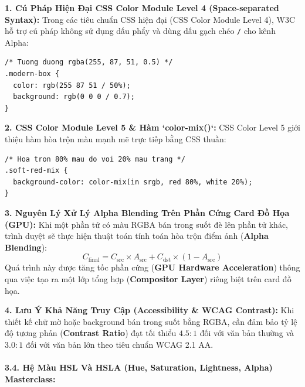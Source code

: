 \documentclass[11pt,oneside]{book}
\newcommand{\codeinline}[1]{\textcolor{accentOrange}{\texttt{#1}}}
\newcommand{\term}[1]{\textbf{\textcolor{primaryBlue}{#1}}}
\begin{document}
\begin{prettyTableBox}
\textbf{1. Cú Pháp Hiện Đại CSS Color Module Level 4 (Space-separated Syntax):}
Trong các tiêu chuẩn CSS hiện đại (CSS Color Module Level 4), W3C hỗ trợ cú pháp không sử dụng dấu phẩy và dùng dấu gạch chéo \codeinline{/} cho kênh Alpha:
\begin{codeWindow}
\begin{lstlisting}[language=CSS3]
/* Tuong duong rgba(255, 87, 51, 0.5) */
.modern-box {
  color: rgb(255 87 51 / 50%);
  background: rgb(0 0 0 / 0.7);
}
\end{lstlisting}
\end{codeWindow}

\textbf{2. CSS Color Module Level 5 \& Hàm `color-mix()`:}
CSS Color Level 5 giới thiệu hàm hòa trộn màu mạnh mẽ trực tiếp bằng CSS thuần:
\begin{codeWindow}
\begin{lstlisting}[language=CSS3]
/* Hoa tron 80% mau do voi 20% mau trang */
.soft-red-mix {
  background-color: color-mix(in srgb, red 80%, white 20%);
}
\end{lstlisting}
\end{codeWindow}

\textbf{3. Nguyên Lý Xử Lý Alpha Blending Trên Phần Cứng Card Đồ Họa (GPU):}
Khi một phần tử có màu RGBA bán trong suốt đè lên phần tử khác, trình duyệt sẽ thực hiện thuật toán tính toán hòa trộn điểm ảnh (\term{Alpha Blending}):
\[
C_{\text{final}} = C_{\text{src}} \times A_{\text{src}} + C_{\text{dst}} \times (1 - A_{\text{src}})
\]
Quá trình này được tăng tốc phần cứng (\term{GPU Hardware Acceleration}) thông qua việc tạo ra một lớp tổng hợp (\term{Compositor Layer}) riêng biệt trên card đồ họa.

\textbf{4. Lưu Ý Khả Năng Truy Cập (Accessibility \& WCAG Contrast):}
Khi thiết kế chữ mờ hoặc background bán trong suốt bằng RGBA, cần đảm bảo tỷ lệ độ tương phản (\term{Contrast Ratio}) đạt tối thiểu $4.5:1$ đối với văn bản thường và $3.0:1$ đối với văn bản lớn theo tiêu chuẩn WCAG 2.1 AA.
\end{prettyTableBox}

\paragraph{3.4. Hệ Màu HSL Và HSLA (Hue, Saturation, Lightness, Alpha) Masterclass:}
\end{document}
